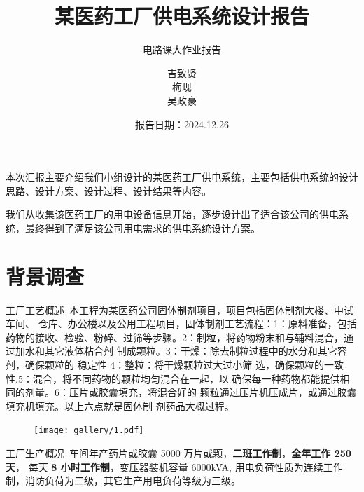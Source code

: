 \documentclass{beamer}
\title{某医药工厂供电系统设计报告}
\subtitle{电路课大作业报告}
\author{吉致贤\\梅现\\吴政豪}
\date{报告日期：2024.12.26}
\begin{document}
    
    \maketitle

    \begin{frame}
    本次汇报主要介绍我们小组设计的某医药工厂供电系统，主要包括供电系统的设计思路、设计方案、设计过程、设计结果等内容。

    我们从收集该医药工厂的用电设备信息开始，逐步设计出了适合该公司的供电系统，最终得到了满足该公司用电需求的供电系统设计方案。

    \end{frame}

    \section{背景调查}
    \begin{frame}{工厂工艺概述}{\thesection \, \secname}
        本工程为某医药公司固体制剂项目，项目包括固体制剂大楼、中试车间、
仓库、办公楼以及公用工程项目，固体制剂工艺流程：1：原料准备，包括
药物的接收、检验、粉碎、过筛等步骤。2：制粒，将药物粉末和与辅料混合，通过加水和其它液体粘合剂
制成颗粒。3：干燥：除去制粒过程中的水分和其它容剂，确保颗粒的
稳定性 4：整粒：将干燥颗粒过大过小筛
选，确保颗粒的一致性.5：混合，将不同药物的颗粒均匀混合在一起，以
确保每一种药物都能提供相同的剂量。6：压片或胶囊填充，将混合好的
颗粒通过压片机压成片，或通过胶囊填充机填充。以上六点就是固体制
剂药品大概过程。
\begin{figure}
    \centering
    \texttt{[image: gallery/1.pdf]}
\end{figure}
    \end{frame}

    \begin{frame}{工厂生产概况}{\thesection \, \secname}
    车间年产药片或胶囊 5000 万片或颗，\textbf{二班工作制}，\textbf{全年工作 250 天}，
每天\textbf{ 8 小时工作制}，变压器装机容量 6000kVA, 用电负荷性质为连续工作
制，消防负荷为二级，其它生产用电负荷等级为三级。
    \end{frame}
\end{document}

